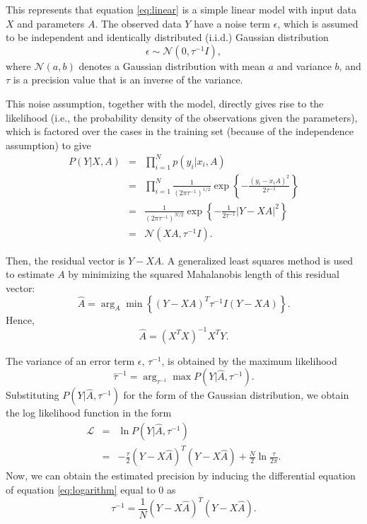 \documentclass[final,authoryear,5p,times,twocolumn]{elsarticle}
\begin{document}
This represents that equation \eqref{eq:linear} is a simple linear model with input data $X$ and parameters $A$. The observed data $Y$ have a noise term $\epsilon$, which is assumed to be independent and identically distributed (i.i.d.) Gaussian distribution
\[
\epsilon \sim \mathcal{N}(0, \tau^{-1}I),
\]
where $\mathcal{N}(a, b)$ denotes a Gaussian distribution with mean $a$ and variance $b$, and $\tau$ is a precision value that is an inverse of the variance.

This noise assumption, together with the model, directly gives rise to the likelihood (i.e., the probability density of the observations given the parameters), which is factored over the cases in the training set (because of the independence assumption) to give \citep[chap. 2]{Gaussian06}
\begin{eqnarray} \label{eq:P_distribution}
P(Y|X,A) &=&
\prod_{i=1}^Np(y_i|x_i,A)\nonumber \\
&=&\prod _{i=1}^N\frac{1}{(2\pi\tau^{-1})^{1/2}}\exp\left \{-\frac{(y_i-x_iA)^2}{2\tau^{-1}}\right \}\nonumber\\
&=&\frac{1}{(2\pi\tau^{-1})^{N/2}}\exp\left \{-\frac{1}{2\tau^{-1}} \left | Y-XA \right |^2 \right\}\nonumber\\
&=&\mathcal{N}(XA,\tau^{-1}I).
\end{eqnarray}

Then, the residual vector is $Y-XA$. A generalized least squares method is used to estimate $A$ by minimizing the squared Mahalanobis length of this residual vector:
\[
\hat{A} = \arg_{A}\min\left \{ (Y-XA)^T\tau^{-1}I(Y-XA) \right \}.
\]
Hence,
\begin{equation} \label{eq:hat_A}
\hat{A} = (X^TX)^{-1}X^TY.
\end{equation}

The variance of an error term $\epsilon$, $\tau^{-1}$, is obtained by the maximum likelihood
\[
\hat{\tau}^{-1} = \arg_{\tau^{-1}}\max P(Y|\hat{A},\tau^{-1}).
\]
Substituting $P(Y|\hat{A},\tau^{-1})$ for the form of the Gaussian distribution, we obtain the log likelihood function in the form \citep[chap. 1]{bishop07}
\begin{eqnarray} \label{eq:logarithm}
\mathcal{L}&=&\ln P(Y|\hat{A},\tau^{-1}) \nonumber \\
&=&-\frac{\tau}{2}(Y-X\hat{A})^T(Y-X\hat{A})+\frac{N}{2}\ln\frac{\tau}{2\pi}.
\end{eqnarray}
Now, we can obtain the estimated precision by inducing the differential equation of equation \eqref{eq:logarithm} equal to 0 as
\begin{equation} \label{eq:tau}
\tau^{-1}=\frac{1}{N}(Y-X\hat{A})^T(Y-X\hat{A}).
\end{equation}
\end{document}
